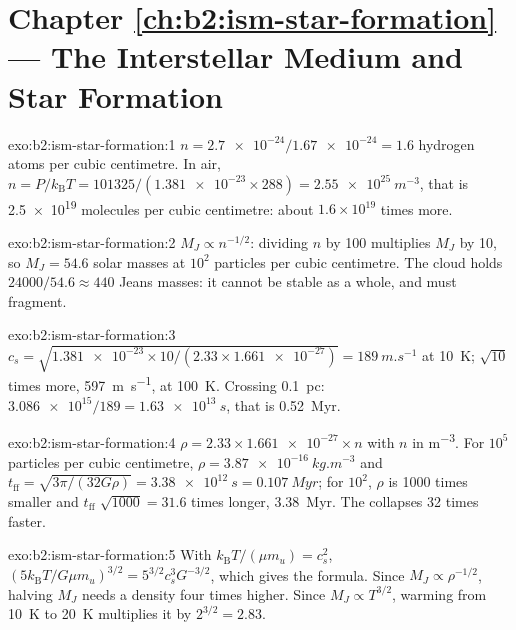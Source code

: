 \section*{Chapter \ref{ch:b2:ism-star-formation} --- The Interstellar Medium and Star Formation}

\begin{solution}{exo:b2:ism-star-formation:1}
$n = \num{2.7e-24}/\num{1.67e-24} = 1.6$ hydrogen atoms per cubic centimetre. In air,
$n = P/k_{\mathrm B}T = 101325/(\num{1.381e-23}\times288) = \qty{2.55e25}{m^{-3}}$,
that is \num{2.5e19} molecules per cubic centimetre: about $1.6\times10^{19}$ times
more.
\end{solution}

\begin{solution}{exo:b2:ism-star-formation:2}
$M_J \propto n^{-1/2}$: dividing $n$ by 100 multiplies $M_J$ by 10, so
$M_J = 54.6$ solar masses at $10^2$ particles per cubic centimetre. The cloud holds
$\num{24000}/54.6 \approx 440$ Jeans masses: it cannot be stable as a whole, and must
fragment.
\end{solution}

\begin{solution}{exo:b2:ism-star-formation:3}
$c_s = \sqrt{\num{1.381e-23}\times10/(2.33\times\num{1.661e-27})} =
\qty{189}{m.s^{-1}}$ at \qty{10}{K}; $\sqrt{10}$ times more, \qty{597}{m.s^{-1}},
at \qty{100}{K}. Crossing \qty{0.1}{pc}: $\num{3.086e15}/189 = \qty{1.63e13}{s}$,
that is \qty{0.52}{Myr}.
\end{solution}

\begin{solution}{exo:b2:ism-star-formation:4}
$\rho = 2.33\times\num{1.661e-27}\times n$ with $n$ in \unit{m^{-3}}. For $10^5$
particles per cubic centimetre, $\rho = \qty{3.87e-16}{kg.m^{-3}}$ and
$t_{\mathrm{ff}} = \sqrt{3\pi/(32G\rho)} = \qty{3.38e12}{s} = \qty{0.107}{Myr}$; for
$10^2$, $\rho$ is \num{1000} times smaller and $t_{\mathrm{ff}}$ $\sqrt{1000} = 31.6$
times longer, \qty{3.38}{Myr}. The  collapses 32 times faster.
\end{solution}

\begin{solution}{exo:b2:ism-star-formation:5}
With $k_{\mathrm B}T/(\mu m_u) = c_s^2$, $(5k_{\mathrm B}T/G\mu m_u)^{3/2} =
5^{3/2}c_s^3G^{-3/2}$, which gives the formula. Since $M_J \propto \rho^{-1/2}$,
halving $M_J$ needs a density four times higher. Since $M_J \propto T^{3/2}$,
warming from \qty{10}{K} to \qty{20}{K} multiplies it by $2^{3/2} = 2.83$.
\end{solution}

